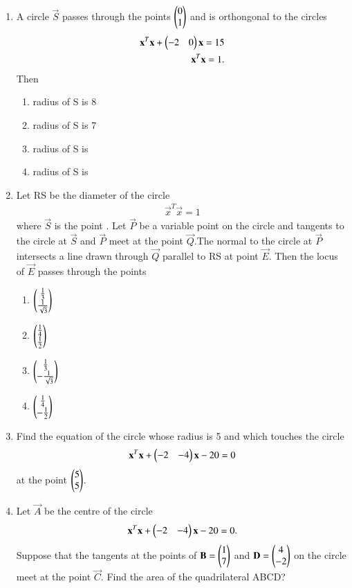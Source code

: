 \begin{enumerate}[label=\arabic*.,ref=\thesubsection.\theenumi]
\item A circle $\vec{S}$ passes through the points $\begin{pmatrix}0 \\ 1\end{pmatrix}$ and is orthongonal to the circles 
\begin{align}
\mathbf{x}^T\mathbf{x}+\begin{pmatrix}-2&0\end{pmatrix}\mathbf{x}=15 \\
\mathbf {x}^T\mathbf{x}=1.
\end{align}
Then  
\begin{enumerate}
\item radius of S is 8
\item radius of S is 7
\item radius of S is 
\item radius of S is 
\end{enumerate}
    
\item Let RS be the diameter of the circle 
\begin{align} 
\vec{x}^T\vec{x}=1
\end{align} 
where $\vec{S}$ is the point . Let $\vec{P}$ be a variable point on the circle and tangents to the circle at $\vec{S}$ and $\vec{P}$ meet at the point $\vec{Q}.$The normal to the circle at $\vec{P}$ intersects a line drawn through $\vec{Q}$ parallel to RS at point $\vec{E}.$ Then the locus of $\vec{E}$ passes through the points 
\begin{enumerate}
\item $\begin{pmatrix}\frac{1}{3} \\ \frac{1}{\sqrt{3}}\end{pmatrix}$
\item $\begin{pmatrix}\frac{1}{4} \\ \frac{1}{2}\end{pmatrix}$
\item $\begin{pmatrix}\frac{1}{3} \\ -\frac{1}{\sqrt{3}}\end{pmatrix}$
\item $\begin{pmatrix}\frac{1}{4} \\ -\frac{1}{2}\end{pmatrix}$
\end{enumerate}
    
\item Find the equation of the circle whose radius is 5 and which touches the circle 
\begin{align}
\mathbf{x}^T\mathbf{x}+\begin{pmatrix}-2&-4\end{pmatrix}\mathbf{x}-20=0
\end{align} 
at the point $\begin{pmatrix}5\\5\end{pmatrix}$.
   
\item Let $\vec{A}$ be the centre of the circle    
\begin{align}
\mathbf{x}^T\mathbf{x}+\begin{pmatrix}-2&-4\end{pmatrix}\mathbf{x}-20=0.
\end{align} 
Suppose that the tangents at the points of $\mathbf{B}=\begin{pmatrix}1 \\ 7\end{pmatrix}$ and $\mathbf{D} = \begin{pmatrix}4 \\-2\end{pmatrix}$ on the circle meet at the point $\vec{C}.$ Find the area of the quadrilateral ABCD?
   

\end{enumerate}
